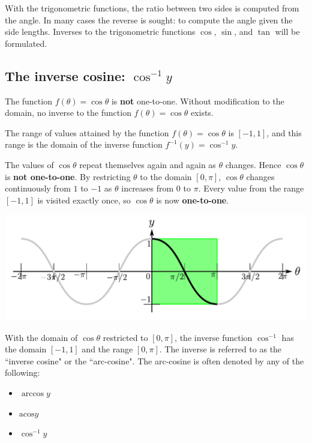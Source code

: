 \documentclass{article}
\begin{document}
With the trigonometric functions, the ratio between two sides is computed from the angle. In many cases the reverse is sought: to compute the angle given the side lengths. Inverses to the trigonometric functions \(\cos\), \(\sin\), and \(\tan\) will be formulated. 



\subsection{The inverse cosine: $\cos^{-1} y$}

The function \(f(\theta) = \cos\theta\) is {\bf not} one-to-one. Without modification to the domain, no inverse to the function \(f(\theta) = \cos\theta\) exists. 

The range of values attained by the function \(f(\theta) = \cos\theta\) is \([-1, 1]\), and this range is the domain of the inverse function \(f^{-1}(y) = \cos^{-1} y\).

The values of \(\cos\theta\) repeat themselves again and again as \(\theta\) changes. Hence \(\cos\theta\) is {\bf not one-to-one}. By restricting \(\theta\) to the domain \([0, \pi]\), \(\cos\theta\) changes continuously from \(1\) to \(-1\) as \(\theta\) increases from \(0\) to \(\pi\). Every value from the range \([-1,1]\) is visited exactly once, so \(\cos\theta\) is now {\bf one-to-one}.  

\includegraphics[width = \textwidth]{making_cos_bijective}

With the domain of \(\cos\theta\) restricted to \([0, \pi]\), the inverse function \(\cos^{-1}\) has the domain \([-1, 1]\) and the range \([0, \pi]\). The inverse is referred to as the ``inverse cosine" or the ``arc-cosine". The arc-cosine is often denoted by any of the following:

\begin{itemize}
\item \(\arccos y\)
\item \(\text{acos} y\)
\item \(\cos^{-1} y\) 
\end{itemize}
\end{document}
